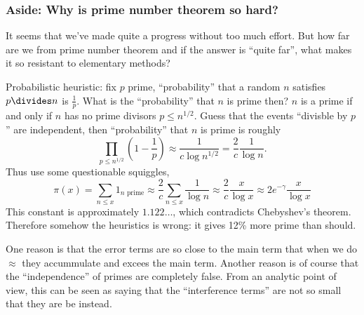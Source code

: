 \documentclass[a4paper]{article}
\begin{document}
\subsubsection{Aside: Why is prime number theorem so hard?}

It seems that we've made quite a progress without too much effort. But how far are we from prime number theorem and if the answer is ``quite far'', what makes it so resistant to elementary methods?

Probabilistic heuristic: fix \(p\) prime, ``probability'' that a random \(n\) satisfies \(p \divides n\) is \(\frac{1}{p}\). What is the ``probability'' that \(n\) is prime then? \(n\) is a prime if and only if \(n\) has no prime divisors \(p \leq n^{1/2}\). Guess that the events ``divisble by \(p\)'' are independent, then ``probability'' that \(n\) is prime is roughly
\[
  \prod_{p \leq n^{1/2}} \left( 1 - \frac{1}{p} \right)
  \approx \frac{1}{c \log n^{1/2}}
  = \frac{2}{c} \frac{1}{\log n}.
\]
Thus use some questionable squiggles,
\[
  \pi(x)
  = \sum_{n \leq x} 1_{n \text{ prime}}
  \approx \frac{2}{c} \sum_{n \leq x} \frac{1}{\log n}
  \approx \frac{2}{c} \frac{x}{\log x}
  \approx 2e^{-\gamma} \frac{x}{\log x}
\]
This constant is approximately \(1.122\dots\), which contradicts Chebyshev's theorem. Therefore somehow the heuristics is wrong: it gives 12\% more prime than should.

One reason is that the error terms are so close to the main term that when we do \(\approx\) they accummulate and excees the main term. Another reason is of course that the ``independence'' of primes are completely false. From an analytic point of view, this can be seen as saying that the ``interference terms'' are not so small that they are be instead.
\end{document}
